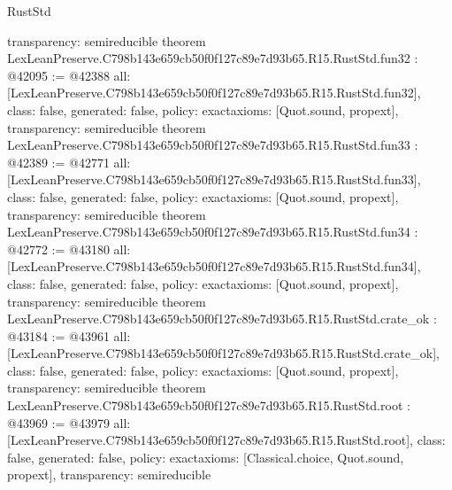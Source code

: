 \begin{lexlean}{RustStd}
\begin{coremodule}
{  transparency: semireducible
}
theorem LexLeanPreserve.C798b143e659cb50f0f127c89e7d93b65.R15.RustStd.fun32 : @42095 := @42388 {
  all: [LexLeanPreserve.C798b143e659cb50f0f127c89e7d93b65.R15.RustStd.fun32],
  class: false,
  generated: false,
  policy: exact{axioms: [Quot.sound, propext]},
  transparency: semireducible
}
theorem LexLeanPreserve.C798b143e659cb50f0f127c89e7d93b65.R15.RustStd.fun33 : @42389 := @42771 {
  all: [LexLeanPreserve.C798b143e659cb50f0f127c89e7d93b65.R15.RustStd.fun33],
  class: false,
  generated: false,
  policy: exact{axioms: [Quot.sound, propext]},
  transparency: semireducible
}
theorem LexLeanPreserve.C798b143e659cb50f0f127c89e7d93b65.R15.RustStd.fun34 : @42772 := @43180 {
  all: [LexLeanPreserve.C798b143e659cb50f0f127c89e7d93b65.R15.RustStd.fun34],
  class: false,
  generated: false,
  policy: exact{axioms: [Quot.sound, propext]},
  transparency: semireducible
}
theorem LexLeanPreserve.C798b143e659cb50f0f127c89e7d93b65.R15.RustStd.crate_ok : @43184 := @43961 {
  all: [LexLeanPreserve.C798b143e659cb50f0f127c89e7d93b65.R15.RustStd.crate_ok],
  class: false,
  generated: false,
  policy: exact{axioms: [Quot.sound, propext]},
  transparency: semireducible
}
theorem LexLeanPreserve.C798b143e659cb50f0f127c89e7d93b65.R15.RustStd.root : @43969 := @43979 {
  all: [LexLeanPreserve.C798b143e659cb50f0f127c89e7d93b65.R15.RustStd.root],
  class: false,
  generated: false,
  policy: exact{axioms: [Classical.choice, Quot.sound, propext]},
  transparency: semireducible
}


\end{coremodule}
\end{lexlean}
